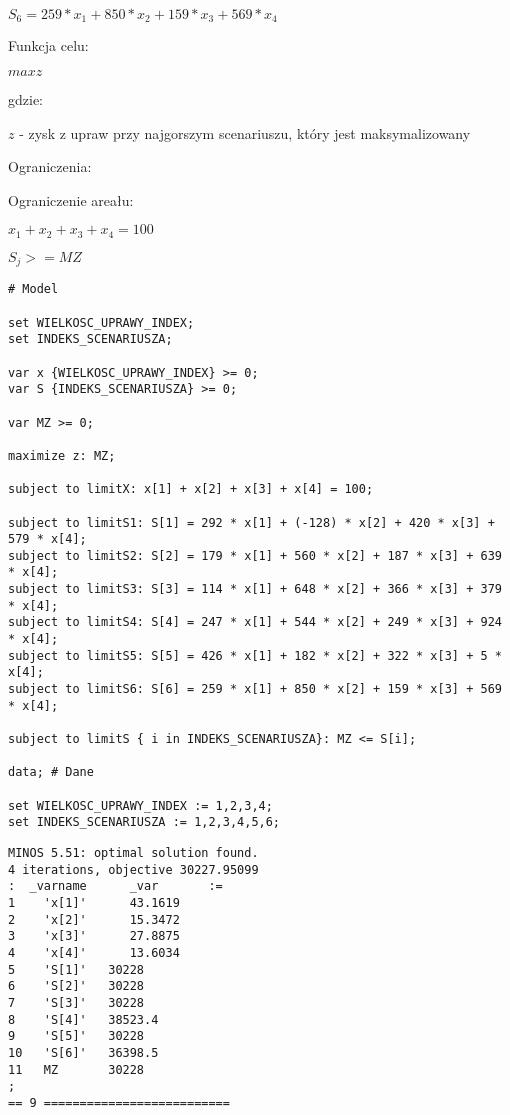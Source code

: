 \documentclass{article}
\begin{document}
$S_6 = 259 * x_1 + 850 * x_2 + 159 * x_3 + 569 * x_4$


\noindent
Funkcja celu:

$max z$ 

gdzie:

$z$ - zysk z upraw przy najgorszym scenariuszu, który jest maksymalizowany

\noindent
Ograniczenia:

Ograniczenie areału:

$x_1 + x_2 + x_3 + x_4 = 100$

$S_j >= MZ$

\lstset{language=AMPL}
\begin{lstlisting}[caption={Model napisany w języku AMPL},label=DescriptiveLabel]
# Model

set WIELKOSC_UPRAWY_INDEX;
set INDEKS_SCENARIUSZA;

var x {WIELKOSC_UPRAWY_INDEX} >= 0;
var S {INDEKS_SCENARIUSZA} >= 0;

var MZ >= 0;

maximize z: MZ;

subject to limitX: x[1] + x[2] + x[3] + x[4] = 100;

subject to limitS1: S[1] = 292 * x[1] + (-128) * x[2] + 420 * x[3] + 579 * x[4];
subject to limitS2: S[2] = 179 * x[1] + 560 * x[2] + 187 * x[3] + 639 * x[4];
subject to limitS3: S[3] = 114 * x[1] + 648 * x[2] + 366 * x[3] + 379 * x[4];
subject to limitS4: S[4] = 247 * x[1] + 544 * x[2] + 249 * x[3] + 924 * x[4];
subject to limitS5: S[5] = 426 * x[1] + 182 * x[2] + 322 * x[3] + 5 * x[4];
subject to limitS6: S[6] = 259 * x[1] + 850 * x[2] + 159 * x[3] + 569 * x[4];

subject to limitS { i in INDEKS_SCENARIUSZA}: MZ <= S[i];

data; # Dane

set WIELKOSC_UPRAWY_INDEX := 1,2,3,4;
set INDEKS_SCENARIUSZA := 1,2,3,4,5,6;
\end{lstlisting}

\lstset{language=AMPL}
\begin{lstlisting}[caption={Wynik modlu z solwerem MINOS.},label=DescriptiveLabel]
MINOS 5.51: optimal solution found.
4 iterations, objective 30227.95099
:  _varname      _var       :=
1    'x[1]'      43.1619
2    'x[2]'      15.3472
3    'x[3]'      27.8875
4    'x[4]'      13.6034
5    'S[1]'   30228
6    'S[2]'   30228
7    'S[3]'   30228
8    'S[4]'   38523.4
9    'S[5]'   30228
10   'S[6]'   36398.5
11   MZ       30228
;
== 9 ==========================
\end{lstlisting}
\end{document}
